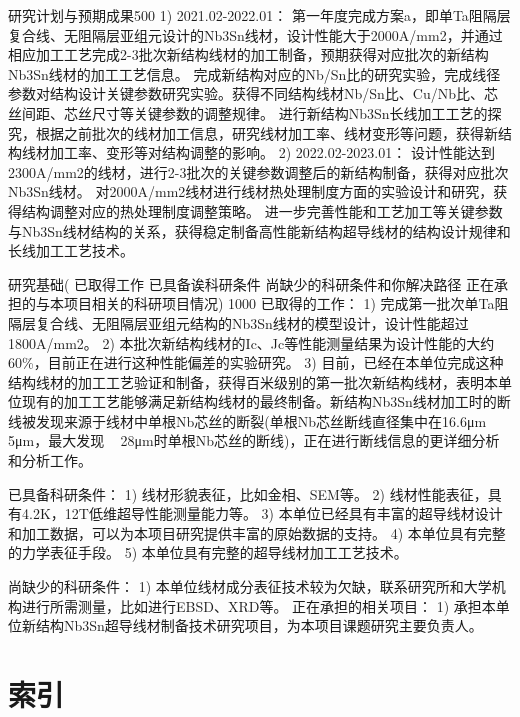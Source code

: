 \documentclass[12pt, a4paper]{ctexbook}
\begin{document}
研究计划与预期成果500
1) 2021.02-2022.01：
第一年度完成方案a，即单Ta阻隔层复合线、无阻隔层亚组元设计的Nb3Sn线材，设计性能大于2000A/mm2，并通过相应加工工艺完成2-3批次新结构线材的加工制备，预期获得对应批次的新结构Nb3Sn线材的加工工艺信息。
完成新结构对应的Nb/Sn比的研究实验，完成线径参数对结构设计关键参数研究实验。获得不同结构线材Nb/Sn比、Cu/Nb比、芯丝间距、芯丝尺寸等关键参数的调整规律。
进行新结构Nb3Sn长线加工工艺的探究，根据之前批次的线材加工信息，研究线材加工率、线材变形等问题，获得新结构线材加工率、变形等对结构调整的影响。
2) 2022.02-2023.01：
设计性能达到2300A/mm2的线材，进行2-3批次的关键参数调整后的新结构制备，获得对应批次Nb3Sn线材。
对2000A/mm2线材进行线材热处理制度方面的实验设计和研究，获得结构调整对应的热处理制度调整策略。
进一步完善性能和工艺加工等关键参数与Nb3Sn线材结构的关系，获得稳定制备高性能新结构超导线材的结构设计规律和长线加工工艺技术。


研究基础( 已取得工作 已具备诶科研条件 尚缺少的科研条件和你解决路径 正在承担的与本项目相关的科研项目情况) 1000
已取得的工作：
        1) 完成第一批次单Ta阻隔层复合线、无阻隔层亚组元结构的Nb3Sn线材的模型设计，设计性能超过1800A/mm2。
2) 本批次新结构线材的Ic、Jc等性能测量结果为设计性能的大约 60\%，目前正在进行这种性能偏差的实验研究。
3) 目前，已经在本单位完成这种结构线材的加工工艺验证和制备，获得百米级别的第一批次新结构线材，表明本单位现有的加工工艺能够满足新结构线材的最终制备。新结构Nb3Sn线材加工时的断线被发现来源于线材中单根Nb芯丝的断裂(单根Nb芯丝断线直径集中在16.6μm ~ 5μm，最大发现 ~ 28μm时单根Nb芯丝的断线)，正在进行断线信息的更详细分析和分析工作。

已具备科研条件：
        1) 线材形貌表征，比如金相、SEM等。
        2) 线材性能表征，具有4.2K，12T低维超导性能测量能力等。
        3) 本单位已经具有丰富的超导线材设计和加工数据，可以为本项目研究提供丰富的原始数据的支持。
        4) 本单位具有完整的力学表征手段。
        5) 本单位具有完整的超导线材加工工艺技术。

尚缺少的科研条件：
        1) 本单位线材成分表征技术较为欠缺，联系研究所和大学机构进行所需测量，比如进行EBSD、XRD等。
正在承担的相关项目：
        1) 承担本单位新结构Nb3Sn超导线材制备技术研究项目，为本项目课题研究主要负责人。



\backmatter

\chapter{索引}
\setcounter{secnumdepth}{0} %




\end{document}
